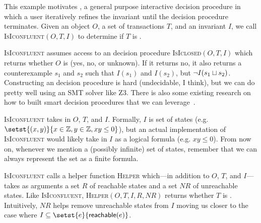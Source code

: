 \newcommand{\IsIconfluent}{\textsc{IsIconfluent}}
\newcommand{\IsIclosed}{\textsc{IsIclosed}}
\newcommand{\Helper}{\textsc{Helper}}

This example motivates , a general
purpose interactive \Iconfluence{} decision procedure in which a user
iteratively refines the invariant until the decision procedure terminates.
Given an object $O$, a set of transactions $T$, and an invariant $I$, we call
\IsIconfluent$(O, T, I)$ to determine if $T$ is \Iconfluent{}.

\IsIconfluent{} assumes access to an \Iclosed{} decision procedure
\IsIclosed$(O, T, I)$ which returns whether $O$ is \Iclosed{} (yes, no, or
unknown). If it returns no, it also returns a counterexample $s_1$ and $s_2$
such that $I(s_1)$ and $I(s_2)$, but $\lnot I(s_1 \sqcup s_2)$.  Constructing an
\Iclosed{} decision procedure is hard (undecidable, I think), but we can do
pretty well using an SMT solver like Z3. There is also some existing research
on how to built smart \Iclosed{} decision procedures that we can
leverage~\cite{li2014automating}.

\IsIconfluent{} takes in $O$, $T$, and $I$. Formally, $I$ is set of states
(e.g. $\setst{(x, y)}{x \in \ints, y \in \ints, xy \leq 0}$), but an actual
implementation of \IsIconfluent{} would likely take in $I$ as a logical formula
(e.g. $xy \leq 0$). From now on, whenever we mention a (possibly infinite) set
of states, remember that we can always represent the set as a finite formula.

\IsIconfluent{} calls a helper function \Helper{} which---in addition to $O$,
$T$, and $I$---takes as arguments a set $R$ of reachable states and a set $NR$
of unreachable states. Like \IsIconfluent, \Helper$(O, T, I, R, NR)$ returns
whether $T$ is \Iconfluent. Intuitively, $NR$ helps remove unreachable states
from $I$ moving us closer to the case where $I \subseteq
\setst{e}{\reachable{e}}$.

